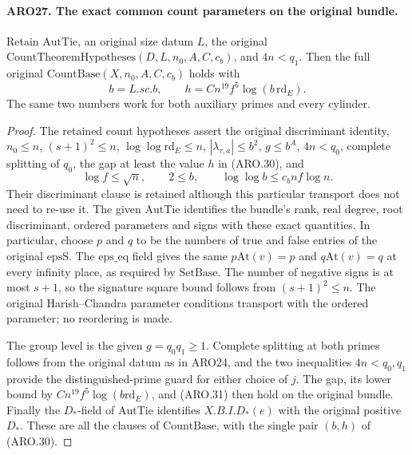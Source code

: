 \documentclass[11pt,a4paper]{article}
\numberwithin{equation}{section}
\theoremstyle{remark}\newtheorem{remark}[theorem]{Remark}
\begin{document}
\paragraph{ARO27. The exact common count parameters on the original bundle.}
\label{claim:ARO27}
Retain \(\mathrm{AutTie}\), an original size datum \(L\), the
original \(\mathrm{CountTheoremHypotheses}(D,L,n_0,A,C,c_b)\),
and \(4n<q_1\).  Then the full original
\(\mathrm{CountBase}(X,n_0,A,C,c_b)\) holds with
\[
 b=L.sc.b,\qquad h=Cn^{19}f^5\log(b\,\mathrm{rd}_E).
 \tag{ARO.30}
\]
The same two numbers work for both auxiliary primes and every
cylinder.
\begin{proof}
The retained count hypotheses assert the original discriminant
identity, \(n_0\leq n\), \((s+1)^2\leq n\),
\(\log\log\mathrm{rd}_E\leq n\),
\(|\lambda_{\tau,a}|\leq b^2\), \(g\leq b^A\),
\(4n<q_0\), complete splitting of \(q_0\), the gap at least
the value \(h\) in (ARO.30), and
\[
 \log f\leq\sqrt n,\qquad 2\leq b,\qquad
              \log\log b\leq c_bnf\log n.            \tag{ARO.31}
\]
Their discriminant clause is retained although this particular
transport does not need to re-use it.  The given \(\mathrm{AutTie}\)
identifies the bundle's rank, real degree, root discriminant,
ordered parameters and signs with these exact quantities.  In
particular, choose \(p\) and \(q\) to be the numbers of true and
false entries of the original \(\mathrm{epsS}\).  The
\(\mathrm{eps\_\allowbreak eq}\) field gives the same
\(p\mathrm{At}(v)=p\) and \(q\mathrm{At}(v)=q\) at every
infinity place, as required by \(\mathrm{SetBase}\).  The
number of negative signs is at most \(s+1\), so the signature
square bound follows from \((s+1)^2\leq n\).  The original
Harish--Chandra parameter conditions transport with the ordered
parameter; no reordering is made.

The group level is the given \(g=q_0q_1\geq1\).  Complete
splitting at both primes follows from the original datum as in
ARO24, and the two inequalities \(4n<q_0,q_1\) provide the
distinguished-prime guard for either choice of \(j\).
The gap, its lower bound by \(Cn^{19}f^5\log(b\mathrm{rd}_E)\),
and (ARO.31) then hold on the original bundle.  Finally the
\(D_*\)-field of \(\mathrm{AutTie}\) identifies
\(X.B.I.D_*(e)\) with the original positive \(D_*\).
These are all the clauses of \(\mathrm{CountBase}\), with the
single pair \((b,h)\) of (ARO.30).
\end{proof}

\end{document}
